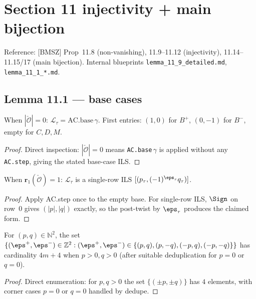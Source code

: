 \chapter{Section 11 injectivity + main bijection}
\label{chap:11_main}

Reference: [BMSZ] Prop~11.8 (non-vanishing), 11.9--11.12 (injectivity),
11.14--11.15/17 (main bijection). Internal blueprints
\texttt{lemma\_11\_9\_detailed.md}, \texttt{lemma\_11\_1\_*.md}.

\section{Lemma 11.1 — base cases}

\begin{lemma}[Lemma 11.1(a): $|\check{\mathcal{O}}| = 0$]
  \label{lem:11_1_a_empty}
  \leanok
  When $|\check{\mathcal{O}}| = 0$: $\mathcal{L}_\tau = \mathrm{AC.base}\,\gamma$.
  First entries: $(1, 0)$ for $B^+$, $(0, -1)$ for $B^-$, empty for $C, D, M$.
\end{lemma}
\begin{proof}
  \leanok
  Direct inspection: $|\check{\mathcal{O}}| = 0$ means \texttt{AC.base}$\,\gamma$ is applied without any \texttt{AC.step}, giving the stated base-case ILS.
\end{proof}


\begin{lemma}[Lemma 11.1(a): $\mathbf{r}_1(\check{\mathcal{O}}) = 1$]
  \label{lem:11_1_a_r1}
  \leanok
  When $\mathbf{r}_1(\check{\mathcal{O}}) = 1$: $\mathcal{L}_\tau$ is a single-row ILS
  $[(p_\tau, (-1)^{\eps_\tau} q_\tau)]$.
\end{lemma}

\begin{proof}
  \leanok
  Apply AC.step once to the empty base. For single-row ILS, $\Sign$ on row~0 gives $(|p|, |q|)$ exactly, so the post-twist by $\eps_\tau$ produces the claimed form.
\end{proof}

\begin{theorem}
  \label{thm:SignTargetSet_card}
  \leanok
  For $(p, q) \in \mathbb{N}^2$, the set $\{(\eps^+, \eps^-) \in \mathbb{Z}^2 : (\eps^+, \eps^-) \in \{(p, q), (p, -q), (-p, q), (-p, -q)\}\}$ has cardinality
  $4m + 4$ when $p > 0, q > 0$ (after suitable deduplication for $p = 0$ or $q = 0$).
\end{theorem}
\begin{proof}
  \leanok
  Direct enumeration: for $p, q > 0$ the set $\{(\pm p, \pm q)\}$ has $4$ elements, with corner cases $p = 0$ or $q = 0$ handled by dedupe.
\end{proof}


